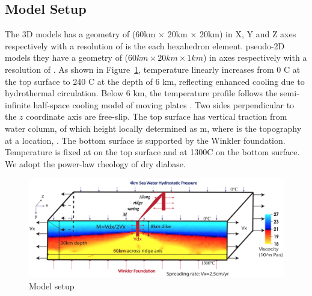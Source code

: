 \subsection{Model Setup}
The 3D models has a geometry of (60km $\times$ 20km $\times$ 20km) in X, Y and Z axes respectively with a resolution of  is the  each hexahedron element.   pseudo-2D models they have a geometry of ($60km \times 20km \times 1km$) in  axes respectively with a resolution of . As shown in Figure~\ref{fig_Methods8_1},  temperature  linearly increases from 0 \degree C at the top surface to 240 \degree C at the depth of 6 km, reflecting enhanced cooling due to hydrothermal circulation. Below 6 km, the temperature profile follows the semi-infinite half-space cooling model of moving plates \citep[e.g.,][]{Turcotte2002}. Two sides perpendicular to the $z$ coordinate axis are free-slip. The top surface has  vertical traction from water column, of which height  locally determined as  m, where  is the topography at a location, . The bottom surface is supported by the Winkler foundation. Temperature is fixed at   on the top surface and at 1300\degree C on the bottom surface. We  adopt the power-law rheology of dry diabase\citep[e.g.,][]{Kirby1987, Buck2005}. 

\begin{figure}[H]
 \centering
  \includegraphics[width=1.0\textwidth] {fig_Methods8_1.png}
 \caption{\small Model setup}
 \label{fig_Methods8_1}
\end{figure}


